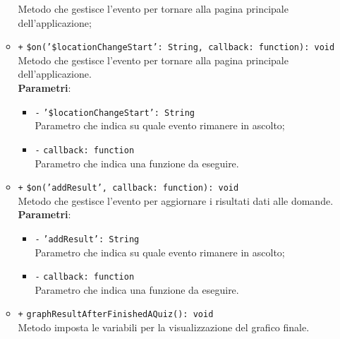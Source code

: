 \begin{itemize}
\begin{itemize}
			Metodo che gestisce l'evento per tornare alla pagina principale dell'applicazione;  
			\item \texttt{+} \texttt{\$on('\$locationChangeStart': String, callback: function): void} \\
			Metodo che gestisce l'evento per tornare alla pagina principale dell'applicazione.\\
			\textbf{Parametri}:
			\begin{itemize}
				\item \texttt{-} \texttt{'\$locationChangeStart': String} \\
				Parametro che indica su quale evento rimanere in ascolto;
				\item \texttt{-} \texttt{callback: function} \\
				Parametro che indica una funzione da eseguire.
			\end{itemize}
			\item \texttt{+} \texttt{\$on('addResult', callback: function): void} \\
			Metodo che gestisce l'evento per aggiornare i risultati dati alle domande. \\
			\textbf{Parametri}:
			\begin{itemize}
				\item \texttt{-} \texttt{'addResult': String} \\
				Parametro che indica su quale evento rimanere in ascolto;
				\item \texttt{-} \texttt{callback: function} \\
				Parametro che indica una funzione da eseguire.
			\end{itemize}
			\item \texttt{+} \texttt{graphResultAfterFinishedAQuiz(): void} \\
			Metodo imposta le variabili per la visualizzazione del grafico finale. 
		\end{itemize}
	\end{itemize}
	
	